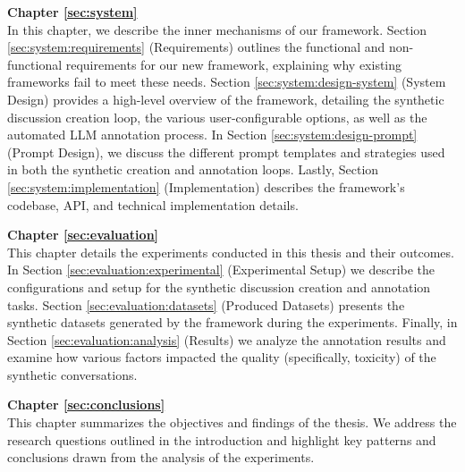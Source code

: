 \textbf{Chapter \ref{sec:system}} \\[0.2em]

In this chapter, we describe the inner mechanisms of our framework. Section \ref{sec:system:requirements} (Requirements) outlines the functional and non-functional requirements for our new framework, explaining why existing frameworks fail to meet these needs. Section \ref{sec:system:design-system} (System Design) provides a high-level overview of the framework, detailing the synthetic discussion creation loop, the various user-configurable options, as well as the automated LLM annotation process. In Section \ref{sec:system:design-prompt} (Prompt Design), we discuss the different prompt templates and strategies used in both the synthetic creation and annotation loops. Lastly, Section \ref{sec:system:implementation} (Implementation) describes the framework's codebase, \ac{API}, and technical implementation details.

\textbf{Chapter \ref{sec:evaluation}} \\[0.2em]

This chapter details the experiments conducted in this thesis and their outcomes. In Section \ref{sec:evaluation:experimental} (Experimental Setup) we describe the configurations and setup for the synthetic discussion creation and annotation tasks. Section \ref{sec:evaluation:datasets} (Produced Datasets)  presents the synthetic datasets generated by the framework during the experiments.  Finally, in Section \ref{sec:evaluation:analysis} (Results) we analyze the annotation results and examine how various factors impacted the quality (specifically, toxicity) of the synthetic conversations.


\textbf{Chapter \ref{sec:conclusions}} \\[0.2em]

This chapter summarizes the objectives and findings of the thesis. We address the research questions outlined in the introduction and highlight key patterns and conclusions drawn from the analysis of the experiments.



